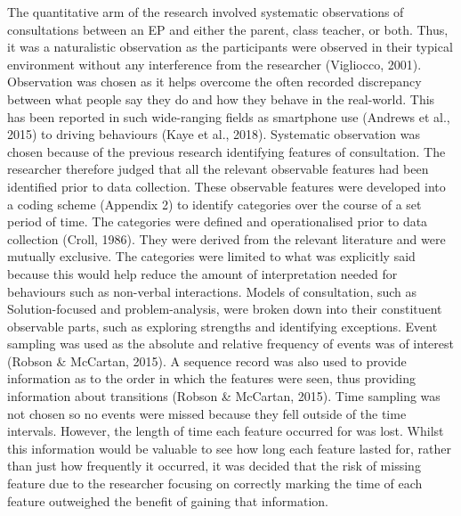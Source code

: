 \documentclass[
  english,
  man]{apa7}
\begin{document}
The quantitative arm of the research involved systematic observations of consultations between an EP and either the parent, class teacher, or both. Thus, it was a naturalistic observation as the participants were observed in their typical environment without any interference from the researcher (Vigliocco, 2001). Observation was chosen as it helps overcome the often recorded discrepancy between what people say they do and how they behave in the real-world. This has been reported in such wide-ranging fields as smartphone use (Andrews et al., 2015) to driving behaviours (Kaye et al., 2018). Systematic observation was chosen because of the previous research identifying features of consultation. The researcher therefore judged that all the relevant observable features had been identified prior to data collection. These observable features were developed into a coding scheme (Appendix 2) to identify categories over the course of a set period of time. The categories were defined and operationalised prior to data collection (Croll, 1986). They were derived from the relevant literature and were mutually exclusive. The categories were limited to what was explicitly said because this would help reduce the amount of interpretation needed for behaviours such as non-verbal interactions. Models of consultation, such as Solution-focused and problem-analysis, were broken down into their constituent observable parts, such as exploring strengths and identifying exceptions. Event sampling was used as the absolute and relative frequency of events was of interest (Robson \& McCartan, 2015). A sequence record was also used to provide information as to the order in which the features were seen, thus providing information about transitions (Robson \& McCartan, 2015). Time sampling was not chosen so no events were missed because they fell outside of the time intervals. However, the length of time each feature occurred for was lost. Whilst this information would be valuable to see how long each feature lasted for, rather than just how frequently it occurred, it was decided that the risk of missing feature due to the researcher focusing on correctly marking the time of each feature outweighed the benefit of gaining that information.
\end{document}
